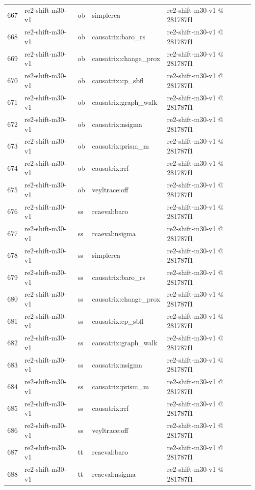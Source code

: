 \begin{longtable}{@{}r>{\raggedright\arraybackslash}p{87.0pt}>{\raggedright\arraybackslash}p{18.0pt}>{\raggedright\arraybackslash}p{63.0pt}>{\raggedright\arraybackslash}p{108.0pt}@{}}
667 & re2-shift-m30-v1 & ob & simplerca & re2-shift-m30-v1 @ 281787f1 \\
668 & re2-shift-m30-v1 & ob & causatrix:baro\_rs & re2-shift-m30-v1 @ 281787f1 \\
669 & re2-shift-m30-v1 & ob & causatrix:change\_prox & re2-shift-m30-v1 @ 281787f1 \\
670 & re2-shift-m30-v1 & ob & causatrix:cp\_sbfl & re2-shift-m30-v1 @ 281787f1 \\
671 & re2-shift-m30-v1 & ob & causatrix:graph\_walk & re2-shift-m30-v1 @ 281787f1 \\
672 & re2-shift-m30-v1 & ob & causatrix:nsigma & re2-shift-m30-v1 @ 281787f1 \\
673 & re2-shift-m30-v1 & ob & causatrix:prism\_m & re2-shift-m30-v1 @ 281787f1 \\
674 & re2-shift-m30-v1 & ob & causatrix:rrf & re2-shift-m30-v1 @ 281787f1 \\
675 & re2-shift-m30-v1 & ob & veyltrace:off & re2-shift-m30-v1 @ 281787f1 \\
676 & re2-shift-m30-v1 & ss & rcaeval:baro & re2-shift-m30-v1 @ 281787f1 \\
677 & re2-shift-m30-v1 & ss & rcaeval:nsigma & re2-shift-m30-v1 @ 281787f1 \\
678 & re2-shift-m30-v1 & ss & simplerca & re2-shift-m30-v1 @ 281787f1 \\
679 & re2-shift-m30-v1 & ss & causatrix:baro\_rs & re2-shift-m30-v1 @ 281787f1 \\
680 & re2-shift-m30-v1 & ss & causatrix:change\_prox & re2-shift-m30-v1 @ 281787f1 \\
681 & re2-shift-m30-v1 & ss & causatrix:cp\_sbfl & re2-shift-m30-v1 @ 281787f1 \\
682 & re2-shift-m30-v1 & ss & causatrix:graph\_walk & re2-shift-m30-v1 @ 281787f1 \\
683 & re2-shift-m30-v1 & ss & causatrix:nsigma & re2-shift-m30-v1 @ 281787f1 \\
684 & re2-shift-m30-v1 & ss & causatrix:prism\_m & re2-shift-m30-v1 @ 281787f1 \\
685 & re2-shift-m30-v1 & ss & causatrix:rrf & re2-shift-m30-v1 @ 281787f1 \\
686 & re2-shift-m30-v1 & ss & veyltrace:off & re2-shift-m30-v1 @ 281787f1 \\
687 & re2-shift-m30-v1 & tt & rcaeval:baro & re2-shift-m30-v1 @ 281787f1 \\
688 & re2-shift-m30-v1 & tt & rcaeval:nsigma & re2-shift-m30-v1 @ 281787f1 \\

\end{longtable}
